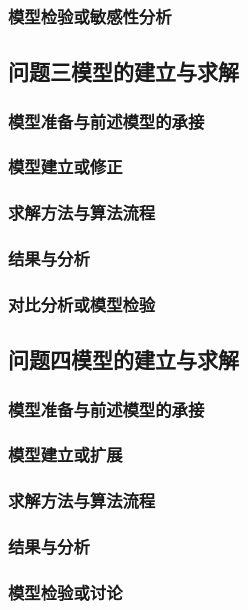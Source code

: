 \subsubsection{模型检验或敏感性分析}

\subsection{问题三模型的建立与求解}
\subsubsection{模型准备与前述模型的承接}
\subsubsection{模型建立或修正}
\subsubsection{求解方法与算法流程}
\subsubsection{结果与分析}
\subsubsection{对比分析或模型检验}

\subsection{问题四模型的建立与求解}
\subsubsection{模型准备与前述模型的承接}
\subsubsection{模型建立或扩展}
\subsubsection{求解方法与算法流程}
\subsubsection{结果与分析}
\subsubsection{模型检验或讨论}

